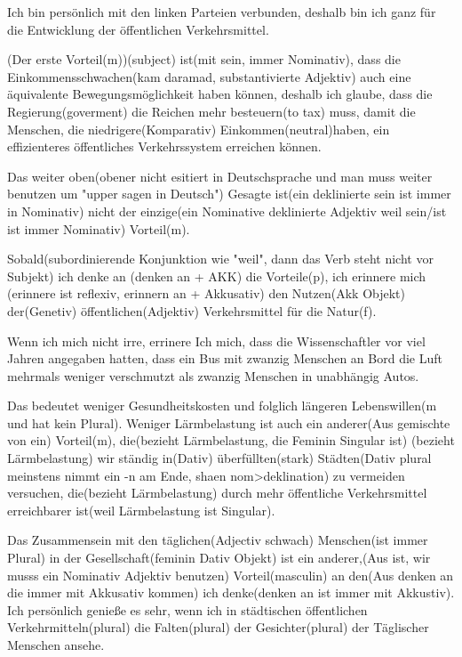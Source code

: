 \documentclass[a4paper,11pt]{article}
\begin{document}
      Ich bin persönlich mit den linken Parteien verbunden, deshalb bin ich ganz für  die Entwicklung der öffentlichen Verkehrsmittel.

      (Der erste Vorteil(m))(subject) ist(mit sein, immer Nominativ), dass die Einkommensschwachen(kam daramad, substantivierte Adjektiv)  auch eine äquivalente Bewegungsmöglichkeit haben können, deshalb ich glaube, dass die Regierung(goverment)  die Reichen mehr besteuern(to tax) muss, damit die Menschen, die niedrigere(Komparativ) Einkommen(neutral)haben, ein effizienteres öffentliches Verkehrssystem erreichen können.

      Das weiter oben(obener nicht esitiert in Deutschsprache und  man muss weiter benutzen um "upper sagen in Deutsch") Gesagte ist(ein deklinierte sein ist immer in Nominativ) nicht der einzige(ein Nominative deklinierte Adjektiv weil sein/ist ist immer Nominativ) Vorteil(m).

      Sobald(subordinierende Konjunktion wie "weil", dann das Verb steht nicht vor Subjekt) ich denke an (denken an + AKK) die Vorteile(p), ich erinnere mich (erinnere ist reflexiv, erinnern an + Akkusativ) den Nutzen(Akk Objekt) der(Genetiv) öffentlichen(Adjektiv) Verkehrsmittel für die Natur(f).

      Wenn ich mich nicht irre,  errinere Ich mich, dass die Wissenschaftler vor viel Jahren angegaben hatten, dass ein Bus mit zwanzig Menschen an Bord  die Luft mehrmals weniger verschmutzt als zwanzig Menschen in unabhängig Autos.

      Das bedeutet weniger Gesundheitskosten und folglich längeren Lebenswillen(m und hat kein Plural). Weniger Lärmbelastung ist auch ein anderer(Aus gemischte von ein) Vorteil(m), die(bezieht Lärmbelastung, die Feminin Singular ist)  (bezieht Lärmbelastung) wir  ständig in(Dativ) überfüllten(stark) Städten(Dativ plural meinstens nimmt ein -n am Ende, shaen nom>deklination) zu vermeiden versuchen, die(bezieht Lärmbelastung) durch mehr öffentliche Verkehrsmittel  erreichbarer ist(weil Lärmbelastung ist Singular). 

      Das Zusammensein mit den täglichen(Adjectiv schwach) Menschen(ist immer Plural) in der Gesellschaft(feminin Dativ Objekt) ist ein anderer,(Aus ist, wir musss ein Nominativ Adjektiv benutzen) Vorteil(masculin) an den(Aus denken an die immer mit Akkusativ kommen) ich denke(denken an ist immer mit Akkustiv). Ich persönlich genieße es sehr, wenn ich in städtischen öffentlichen Verkehrmitteln(plural) die Falten(plural) der Gesichter(plural) der Täglischer Menschen ansehe. 
\end{document}
